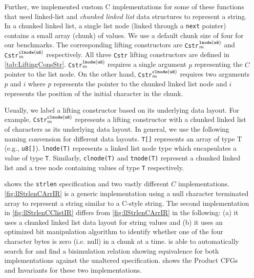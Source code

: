 Further, we implemented
custom C implementations for some of these functions that used
linked-list
and {\em chunked linked list} data structures
to represent a string.
In a chunked linked list, a single list node (linked
through a {\tt next} pointer)
contains a small array (chunk) of values.
We use a default chunk size of four for our
benchmarks.
The corresponding lifting constructors are {\tt Cstr}$^{\tt lnode(u8)}_m$
and {\tt Cstr}$^{\tt clnode(u8)}_m$ respectively.
All three {\tt Cstr} lifting constructors are defined in \cref{tab:LiftingConsStr}.
{\tt Cstr}$^{\tt lnode(u8)}_m$ requires a single
argument $p$ representing the $C$ pointer to the list node.
On the other hand, {\tt Cstr}$^{\tt clnode(u8)}_m$ requires two arguments $p$
and $i$ where $p$ represents the pointer to the chunked linked list node
and $i$ represents the position of the initial character in the chunk.

Usually, we label a lifting constructor based on its underlying data layout.
For example, {\tt Cstr}$^{\tt clnode(u8)}_m$ represents a lifting constructor
with a chunked linked list of characters as its underlying data layout.
In general, we use the following naming convension for different data layouts.
{\tt T[]} represents an array of type T (e.g., {\tt u8[]}).
{\tt lnode(T)} represents a  linked list node type which encapsulates a value of type {\tt T}.
Similarly, {\tt clnode(T)} and {\tt tnode(T)} represent a chunked linked list and a tree node
containing values of type {\tt T} respectively.



 shows the {\tt strlen} specification and two vastly
different $C$ implementations. \cref{fig:llStrlenCArrIR} is a generic implementation
using a null character terminated array to represent a string similar to a C-style string.
The second implementation in \cref{fig:llStrlenCClistIR} differs from \cref{fig:llStrlenCArrIR}
in the following: (a) it uses a chunked linked list data layout for string values
and (b) it uses an optimized bit manipulation algorithm to identify whether one of the four
character bytes is zero (i.e. null) in a chunk at a time. \toolName{} is able to automatically
search for and find a bisimulation relation showing equivalence
for both implementations against the unaltered specification.
 shows the Product CFGs and Invariants for these two implementations.



